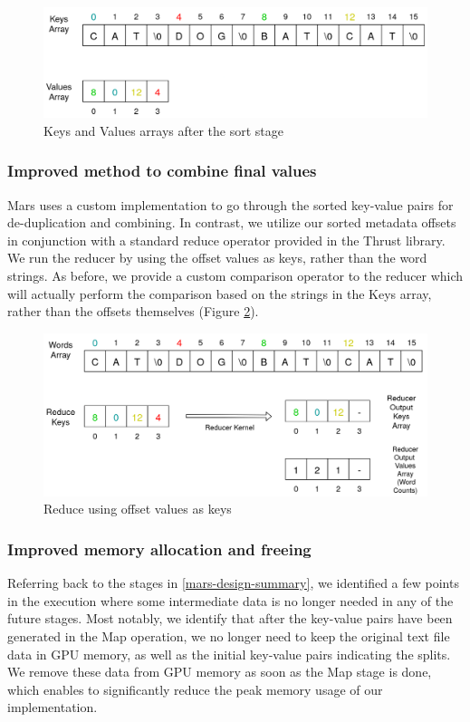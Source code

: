 \documentclass{article}
\begin{document}
\begin{figure}
    \centering
    \includegraphics[width=0.9\linewidth]{images/map-kv-sorted.png}
    \caption{Keys and Values arrays after the sort stage}
    \label{fig:map-kv-sorted}
\end{figure}

\subsubsection{Improved method to combine final values}
Mars uses a custom implementation to go through the sorted key-value pairs for de-duplication and combining. In contrast, we utilize our sorted metadata offsets in conjunction with a standard reduce operator provided in the  Thrust library. We run the reducer by using the offset values as keys, rather than the word strings. As before, we provide a custom comparison operator to the reducer which will actually perform the comparison based on the strings in the Keys array, rather than the offsets themselves (Figure \ref{fig:reduce-kv-out}).

\begin{figure}
    \centering
    \includegraphics[width=0.9\linewidth]{images/reduce-kv-out.png}
    \caption{Reduce using offset values as keys}
    \label{fig:reduce-kv-out}
\end{figure}

\subsubsection{Improved memory allocation and freeing} \label{improved-free}
Referring back to the stages in \ref{mars-design-summary}, we identified a few points in the execution where some intermediate data is no longer needed in any of the future stages. Most notably, we identify that after the key-value pairs have been generated in the Map operation, we no longer need to keep the original text file data in GPU memory, as well as the initial key-value pairs indicating the splits. We remove these data from GPU memory as soon as the Map stage is done, which enables to significantly reduce the peak memory usage of our implementation.
\end{document}
